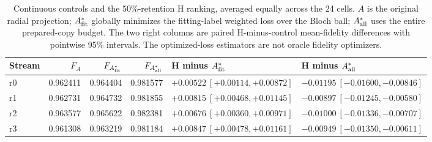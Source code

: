 \begin{table}[ht]
\centering
\scriptsize
\setlength{\tabcolsep}{3pt}
\caption{Continuous controls and the 50\%-retention H ranking, averaged equally across the 24 cells. $A$ is the original radial projection; $A^*_{\rm fit}$ globally minimizes the fitting-label weighted loss over the Bloch ball; $A^*_{\rm all}$ uses the entire prepared-copy budget. The two right columns are paired H-minus-control mean-fidelity differences with pointwise 95\% intervals. The optimized-loss estimators are not oracle fidelity optimizers.}
\label{tab:r4-continuous}
\begin{tabular}{@{}lrrrll@{}}
\toprule
Stream & $F_A$ & $F_{A^*_{\rm fit}}$ & $F_{A^*_{\rm all}}$ & H minus $A^*_{\rm fit}$ & H minus $A^*_{\rm all}$ \\
\midrule
r0 & 0.962411 & 0.964404 & 0.981577 & $+0.00522\ [+0.00114,+0.00872]$ & $-0.01195\ [-0.01600,-0.00846]$ \\
r1 & 0.962731 & 0.964732 & 0.981855 & $+0.00815\ [+0.00468,+0.01145]$ & $-0.00897\ [-0.01245,-0.00580]$ \\
r2 & 0.963577 & 0.965622 & 0.982381 & $+0.00676\ [+0.00360,+0.00971]$ & $-0.01000\ [-0.01336,-0.00707]$ \\
r3 & 0.961308 & 0.963219 & 0.981184 & $+0.00847\ [+0.00478,+0.01161]$ & $-0.00949\ [-0.01350,-0.00611]$ \\
\bottomrule
\end{tabular}
\end{table}
